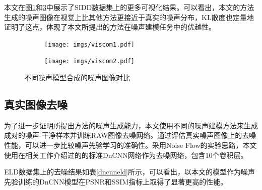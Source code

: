 本文在图\ref{viscom1}和\ref{viscom2}中展示了SIDD数据集上的更多可视化结果。可以看出，本文的方法生成的噪声图像在视觉上比其他方法更接近于真实的噪声分布，KL散度也定量地证明了这点，体现了本文所提出的方法在噪声建模任务中的优越性。

\begin{figure}[htbp]
	\centering
	\begin{subfigure}{\linewidth}
		\centering
		\texttt{[image: imgs/viscom1.pdf]}
		\caption{}
		\label{viscom1}%
	\end{subfigure}
	\centering
	\begin{subfigure}{\linewidth}
		\centering
		\texttt{[image: imgs/viscom2.pdf]}
		\caption{}
		\label{viscom2}%
	\end{subfigure}  
	
	\caption{不同噪声模型合成的噪声图像对比}
\end{figure}

\subsection{真实图像去噪}

为了进一步证明所提出方法的噪声生成能力，本文使用不同的噪声建模方法来生成成对的噪声-干净样本并训练RAW图像去噪网络。通过评估真实噪声图像上的去噪性能，可以进一步比较噪声先验学习的准确性。采用Noise Flow\cite{noiseflow}的实验思路，本文使用在相关工作介绍过的的标准DnCNN网络\cite{dncnn}作为去噪网络，包含10个卷积层。

ELD数据集上的去噪结果如表\ref{dncnneld}所示，可以看出，以本文的模型作为噪声先验训练的DnCNN模型在PSNR和SSIM指标上取得了显著更高的性能。

